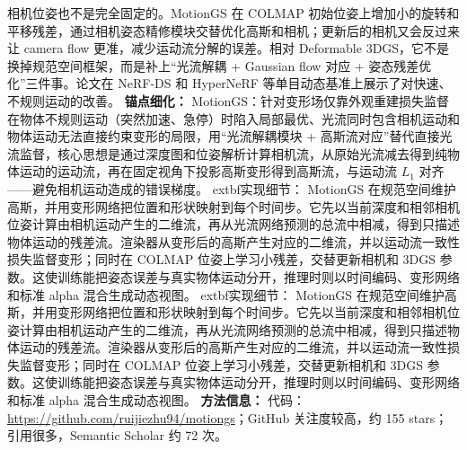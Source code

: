 相机位姿也不是完全固定的。MotionGS 在 COLMAP 初始位姿上增加小的旋转和平移残差，通过相机姿态精修模块交替优化高斯和相机；更新后的相机又会反过来让 camera flow 更准，减少运动流分解的误差。相对 Deformable 3DGS，它不是换掉规范空间框架，而是补上“光流解耦 + Gaussian flow 对应 + 姿态残差优化”三件事。论文在 NeRF-DS 和 HyperNeRF 等单目动态基准上展示了对快速、不规则运动的改善。
\textbf{锚点细化：} MotionGS：针对变形场仅靠外观重建损失监督在物体不规则运动（突然加速、急停）时陷入局部最优、光流同时包含相机运动和物体运动无法直接约束变形的局限，用``光流解耦模块 + 高斯流对应''替代直接光流监督，核心思想是通过深度图和位姿解析计算相机流，从原始光流减去得到纯物体运动的运动流，再在固定视角下投影高斯变形得到高斯流，与运动流 $L_1$ 对齐——避免相机运动造成的错误梯度。
	extbf{实现细节：} MotionGS 在规范空间维护高斯，并用变形网络把位置和形状映射到每个时间步。它先以当前深度和相邻相机位姿计算由相机运动产生的二维流，再从光流网络预测的总流中相减，得到只描述物体运动的残差流。渲染器从变形后的高斯产生对应的二维流，并以运动流一致性损失监督变形；同时在 COLMAP 位姿上学习小残差，交替更新相机和 3DGS 参数。这使训练能把姿态误差与真实物体运动分开，推理时则以时间编码、变形网络和标准 alpha 混合生成动态视图。
	extbf{实现细节：} MotionGS 在规范空间维护高斯，并用变形网络把位置和形状映射到每个时间步。它先以当前深度和相邻相机位姿计算由相机运动产生的二维流，再从光流网络预测的总流中相减，得到只描述物体运动的残差流。渲染器从变形后的高斯产生对应的二维流，并以运动流一致性损失监督变形；同时在 COLMAP 位姿上学习小残差，交替更新相机和 3DGS 参数。这使训练能把姿态误差与真实物体运动分开，推理时则以时间编码、变形网络和标准 alpha 混合生成动态视图。
\textbf{方法信息：} 代码：\url{https://github.com/ruijiezhu94/motiongs}；GitHub 关注度较高，约 155 stars；引用很多，Semantic Scholar 约 72 次。



